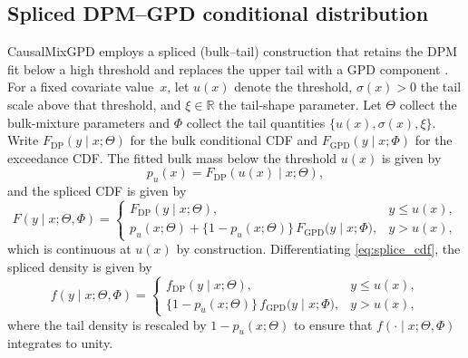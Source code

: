 \documentclass[preprint,12pt,authoryear]{elsarticle}
\newcommand{\pkg}[1]{\textsf{#1}}
\begin{document}
\subsection{Spliced DPM--GPD conditional distribution}
\label{subsec:splice}

\pkg{CausalMixGPD} employs a spliced (bulk--tail) construction that
retains the DPM fit below a high threshold and replaces the upper tail
with a GPD component
\citep{Frigessi2002,Behrens2004,Coles2001}.  For a fixed covariate
value~$x$, let $u(x)$ denote the threshold, $\sigma(x)>0$ the tail
scale above that threshold, and $\xi\in\mathbb{R}$ the tail-shape
parameter.  Let $\Theta$ collect the bulk-mixture parameters and
$\Phi$ collect the tail quantities $\{u(x),\sigma(x),\xi\}$.  Write
$F_{\mathrm{DP}}(y\mid x;\Theta)$ for the bulk conditional CDF and
$F_{\mathrm{GPD}}(y\mid x;\Phi)$ for the exceedance CDF.  The fitted bulk mass below the threshold $u(x)$ is given by
\begin{equation*}
p_u(x)=F_{\mathrm{DP}}(u(x)\mid x;\Theta),
\end{equation*}
and the spliced CDF is given by
\begin{equation}
F(y\mid x;\Theta,\Phi)=
\begin{cases}
F_{\mathrm{DP}}(y\mid x;\Theta), & y \le u(x),\\[6pt]
p_u(x;\Theta)
+
\bigl\{1-p_u(x;\Theta)\bigr\}\,
F_{\mathrm{GPD}}\!\bigl(y\mid x;\Phi\bigr),
& y>u(x),
\end{cases}
\label{eq:splice_cdf}
\end{equation}
which is continuous at $u(x)$ by construction.  Differentiating
\eqref{eq:splice_cdf}, the spliced density is given by
\begin{equation}
f(y\mid x;\Theta,\Phi)=
\begin{cases}
f_{\mathrm{DP}}(y\mid x;\Theta), & y \le u(x),\\[8pt]
\bigl\{1-p_u(x;\Theta)\bigr\}\,
f_{\mathrm{GPD}}\!\bigl(y\mid x;\Phi\bigr),
& y>u(x),
\end{cases}
\label{eq:splice_pdf}
\end{equation}
where the tail density is rescaled by $1-p_u(x;\Theta)$ to ensure that
$f(\cdot\mid x;\Theta,\Phi)$ integrates to unity.
\end{document}
